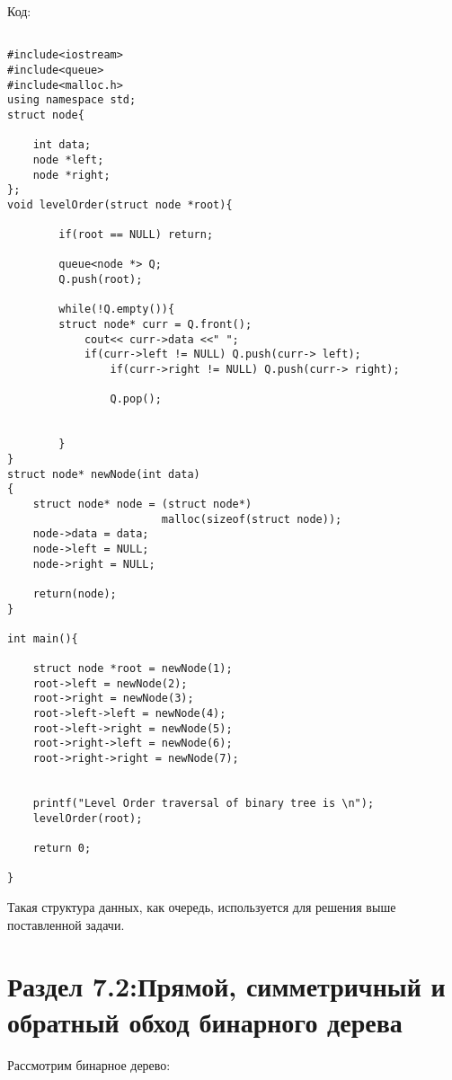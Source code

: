 \vspace{\baselineskip}
Код:

\vspace{\baselineskip}
\vspace{-0.2cm}
\begin{tcolorbox}
\begin{verbatim}

#include<iostream>
#include<queue>
#include<malloc.h>
using namespace std;
struct node{

    int data;
    node *left;
    node *right;
};
void levelOrder(struct node *root){

        if(root == NULL) return;

        queue<node *> Q;
        Q.push(root);

        while(!Q.empty()){
        struct node* curr = Q.front();
            cout<< curr->data <<" ";
            if(curr->left != NULL) Q.push(curr-> left);
                if(curr->right != NULL) Q.push(curr-> right);

                Q.pop();


        }
}
struct node* newNode(int data)
{
    struct node* node = (struct node*)
                        malloc(sizeof(struct node));
    node->data = data;
    node->left = NULL;
    node->right = NULL;

    return(node);
}

int main(){

    struct node *root = newNode(1);
    root->left = newNode(2);
    root->right = newNode(3);
    root->left->left = newNode(4);
    root->left->right = newNode(5);
    root->right->left = newNode(6);
    root->right->right = newNode(7);
    
    
    printf("Level Order traversal of binary tree is \n");
    levelOrder(root);

    return 0;

}

\end{verbatim}
\end{tcolorbox}

\vspace{\baselineskip}
\vspace{-0.3cm}
Такая структура данных, как очередь, используется для решения выше поставленной задачи.


\section*{Раздел 7.2:Прямой, симметричный и обратный обход \newline бинарного дерева}
Рассмотрим бинарное дерево:

